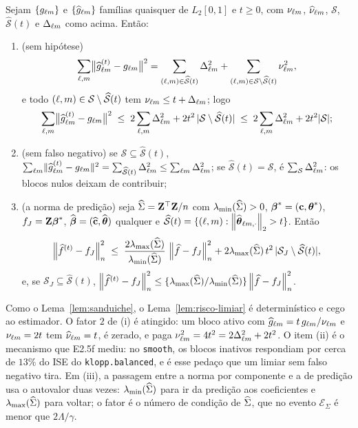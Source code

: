 \documentclass[11pt,a4paper]{article}
\newcommand{\lmin}{\lambda_{\min}}
\newcommand{\bbeta}{\boldsymbol{\beta}}
\newcommand{\betahat}{\widehat{\bbeta}}
\newcommand{\ghat}[2]{\widehat{g}_{#1#2}}
\newcommand{\Nhat}[2]{\widehat{\nu}_{#1#2}}
\newcommand{\Ntrue}[2]{\nu_{#1#2}}
\newcommand{\Shat}{\widehat{\mathcal{S}}}
\newcommand{\lmaxx}{\lambda_{\max}}
\newcommand{\ESig}{\mathcal{E}_{\Sigma}}
\newcommand{\Dbl}{\Delta_{\cv\md}}
\newcommand{\betastar}{\bbeta^{*}}
\begin{document}
\setcounter{lemma}{15}
\begin{lemma}\label{lem:risco-limiar}
Sejam $\{g_{\ell m}\}$ e $\{\ghat{\cv}{\md}\}$ famílias quaisquer de
$L_{2}[0,1]$ e $t \ge 0$, com $\Ntrue{\cv}{\md}$, $\Nhat{\cv}{\md}$,
$\mathcal{S}$, $\Shat(t)$ e $\Dbl$ como acima. Então:
\begin{enumerate}[label=\textup{(\roman*)}, leftmargin=*]
  \item \textup{(sem hipótese)}
    \[
      \sum_{\cv,\md}\bigl\lVert\ghat{\cv}{\md}^{(t)} - \gcomp{\cv}{\md}\bigr\rVert^{2}
      = \sum_{(\cv,\md)\in\Shat(t)}\Dbl^{2}
      + \sum_{(\cv,\md)\in\mathcal{S}\setminus\Shat(t)}\Ntrue{\cv}{\md}^{2},
    \]
    e todo $(\cv,\md) \in \mathcal{S}\setminus\Shat(t)$ tem
    $\Ntrue{\cv}{\md} \le t + \Dbl$; logo
    \[
      \sum_{\cv,\md}\bigl\lVert\ghat{\cv}{\md}^{(t)} - \gcomp{\cv}{\md}\bigr\rVert^{2}
      \;\le\; 2\sum_{\cv,\md}\Dbl^{2} + 2t^{2}\,|\mathcal{S}\setminus\Shat(t)|
      \;\le\; 2\sum_{\cv,\md}\Dbl^{2} + 2t^{2}|\mathcal{S}| ;
    \]
  \item \textup{(sem falso negativo)} se $\mathcal{S} \subseteq \Shat(t)$,
    $\sum_{\cv\md}\lVert\ghat{\cv}{\md}^{(t)} - \gcomp{\cv}{\md}\rVert^{2} =
    \sum_{\Shat(t)}\Dbl^{2} \le \sum_{\cv\md}\Dbl^{2}$; se $\Shat(t) =
    \mathcal{S}$, é $\sum_{\mathcal{S}}\Dbl^{2}$: os blocos nulos deixam de
    contribuir;
  \item \textup{(a norma de predição)} seja $\widehat{\Sigma} = \mathbf{Z}^{\top}\mathbf{Z}/n$ com
    $\lmin(\Gramhat) > 0$, $\betastar = (\bc,\thetastar)$, $f_{J} =
    \bZ\betastar$, $\betahat = (\chat,\thetahat)$ qualquer e $\Shat(t) =
    \{(\cv,\md) : \norm{\thetahat_{\cv\md,\cdot}}_{2} > t\}$. Então
    \[
      \normn{\widehat f^{(t)} - f_{J}}^{2}
      \;\le\; \frac{2\lmaxx(\Gramhat)}{\lmin(\Gramhat)}\,
      \normn{\widehat f - f_{J}}^{2}
      + 2\lmaxx(\Gramhat)\,t^{2}\,|\mathcal{S}_{J}\setminus\Shat(t)|,
    \]
    e, se $\mathcal{S}_{J} \subseteq \Shat(t)$, $\normn{\widehat f^{(t)} -
    f_{J}}^{2} \le \{\lmaxx(\Gramhat)/\lmin(\Gramhat)\}
    \normn{\widehat f - f_{J}}^{2}$.
\end{enumerate}
\end{lemma}

Como o Lema~\ref{lem:sanduiche}, o Lema~\ref{lem:risco-limiar} é
determinístico e cego ao estimador. O fator $2$ de (i) é atingido: um bloco
ativo com $\ghat{\cv}{\md} = t\,\gcomp{\cv}{\md}/\Ntrue{\cv}{\md}$ e
$\Ntrue{\cv}{\md} = 2t$ tem $\Nhat{\cv}{\md} = t$, é zerado, e paga
$\Ntrue{\cv}{\md}^{2} = 4t^{2} = 2\Dbl^{2} + 2t^{2}$. O item (ii) é o
mecanismo que E2.5f mediu: no \texttt{smooth}, os blocos inativos respondiam
por cerca de $13\%$ do ISE do \texttt{klopp.balanced}, e é esse pedaço que um
limiar sem falso negativo tira. Em (iii), a passagem entre a norma por
componente e a de predição usa o autovalor duas vezes: $\lmin(\Gramhat)$ para
ir da predição aos coeficientes e $\lmaxx(\Gramhat)$ para voltar; o fator é o
número de condição de $\widehat{\Sigma}$, que no evento $\ESig$ é menor que
$2\Lambda/\gamma$.
\end{document}
